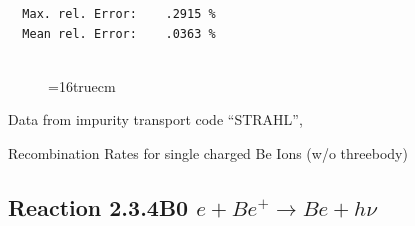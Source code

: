 \documentclass[12pt,dvips]{article}
\begin{document}
\begin{small}
\begin{verbatim}
  Max. rel. Error:    .2915 %
  Mean rel. Error:    .0363 %


\end{verbatim}\end{small}
\begin{figure} \label{2.3.2C}
\epsfxsize=16truecm
\end{figure}
\newpage
Data from impurity transport code ``STRAHL'', \cite{kn:Behringer}

  Recombination Rates for single charged Be Ions (w/o threebody)

\subsection{
Reaction 2.3.4B0  $e + Be^+ \rightarrow Be + h\nu$
}
\end{document}
